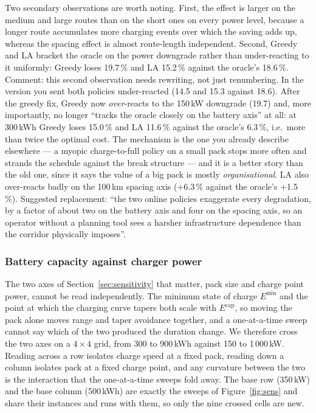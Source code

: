 \documentclass[preprint,12pt,3p]{elsarticle}
\newcommand{\green}[1]{{\color{darkgreen}#1}}
\newcommand{\blue}[1]{{\color{darkblue}#1}}
\begin{document}
Two secondary observations are worth noting.
First, the effect is larger on the medium and large routes than on the short ones on every power level, because a longer route accumulates more charging events over which the saving adds up, whereas the spacing effect is almost route-length independent.
Second, \blue{Greedy and LA bracket the oracle on the power downgrade rather than
under-reacting to it uniformly: Greedy loses 19.7\,\% and LA 15.2\,\% against the
oracle's 18.6\,\%.}
\green{Comment: this second observation needs rewriting, not just renumbering. In the
version you sent both policies under-reacted (14.5 and 15.3 against 18.6). After the
greedy fix, Greedy now \emph{over}-reacts to the 150\,kW downgrade (19.7) and, more
importantly, no longer ``tracks the oracle closely on the battery axis'' at all:
at 300\,kWh Greedy loses 15.0\,\% and LA 11.6\,\% against the oracle's 6.3\,\%, i.e.\ more
than twice the optimal cost. The mechanism is the one you already describe
elsewhere --- a myopic charge-to-full policy on a small pack stops more often and
strands the schedule against the break structure --- and it is a better story than
the old one, since it says the value of a big pack is mostly \emph{organisational}.
LA also over-reacts badly on the 100\,km spacing axis (+6.3\,\% against the oracle's
+1.5\,\%). Suggested replacement: ``the two online policies exaggerate every
degradation, by a factor of about two on the battery axis and four on the spacing
axis, so an operator without a planning tool sees a harsher infrastructure
dependence than the corridor physically imposes''.}


\subsubsection{Battery capacity against charger power}
\label{sec:grid}

The two axes of Section~\ref{sec:sensitivity} that matter, pack size and charge point
power, cannot be read independently. The minimum state of charge $E^{\min}$ and the
point at which the charging curve tapers both scale with $E^{\mathrm{cap}}$, so moving
the pack alone moves range and taper avoidance together, and a one-at-a-time sweep
cannot say which of the two produced the duration change. We therefore cross the two
axes on a $4 \times 4$ grid, from 300 to 900\,kWh against 150 to 1\,000\,kW. Reading
across a row isolates charge speed at a fixed pack, reading down a column isolates
pack at a fixed charge point, and any curvature between the two is the interaction
that the one-at-a-time sweeps fold away. The base row (350\,kW) and the base column
(500\,kWh) are exactly the sweeps of Figure~\ref{fig:sens} and share their instances
and runs with them, so only the nine crossed cells are new.
\end{document}
